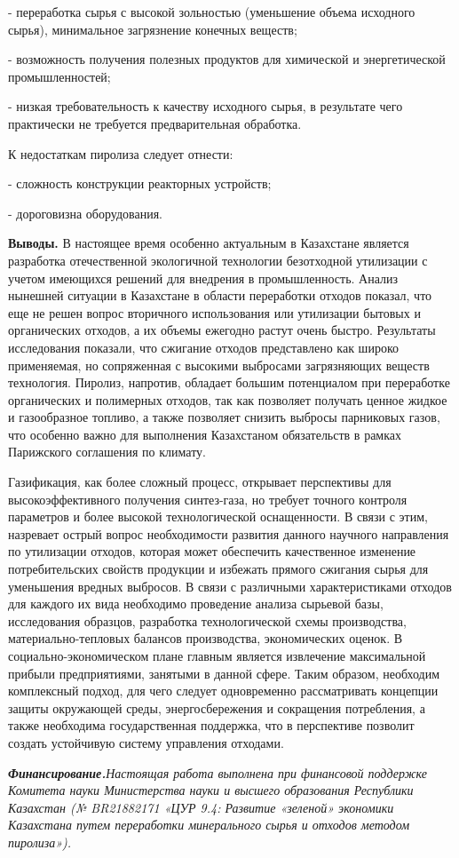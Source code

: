 \begin{multicols}{2}
- переработка сырья с высокой зольностью (уменьше­ние объема исходного
сырья), минимальное загрязнение конечных веществ;

- возможность получения полезных продуктов для химической и
энергетической промышленностей;

- низкая требовательность к качеству исходного сырья, в результате чего
практически не требуется предвари­тельная обработка.

К недостаткам пиролиза следует отнести:

- сложность конструкции реакторных устройств;

- дороговизна оборудования.

{\bfseries Выводы.} В настоящее время особенно актуальным в Казахстане
является разработка отечественной экологичной технологии безотходной
утилизации с учетом имеющихся решений для внедрения в промышленность.
Анализ нынешней ситуации в Казахстане в области переработки отходов
показал, что еще не решен вопрос вторичного использования или утилизации
бытовых и органических отходов, а их объемы ежегодно растут очень
быстро. Результаты исследования показали, что сжигание отходов
представлено как широко применяемая, но сопряженная с высокими выбросами
загрязняющих веществ технология. Пиролиз, напротив, обладает большим
потенциалом при переработке органических и полимерных отходов, так как
позволяет получать ценное жидкое и газообразное топливо, а также
позволяет снизить выбросы парниковых газов, что особенно важно для
выполнения Казахстаном обязательств в рамках Парижского соглашения по
климату.

Газификация, как более сложный процесс, открывает перспективы для
высокоэффективного получения синтез-газа, но требует точного контроля
параметров и более высокой технологической оснащенности. В связи с этим,
назревает острый вопрос необходимости развития данного научного
направления по утилизации отходов, которая может обеспечить качественное
изменение потребительских свойств продукции и избежать прямого сжигания
сырья для уменьшения вредных выбросов. В связи с различными
характеристиками отходов для каждого их вида необходимо проведение
анализа сырьевой базы, исследования образцов, разработка технологической
схемы производства, материально-тепловых балансов производства,
экономических оценок. В социально-экономическом плане главным является
извлечение максимальной прибыли предприятиями, занятыми в данной сфере.
Таким образом, необходим комплексный подход, для чего следует
одновременно рассматривать концепции защиты окружающей среды,
энергосбережения и сокращения потребления, а также необходима
государственная поддержка, что в перспективе позволит создать устойчивую
систему управления отходами.

\emph{{\bfseries Финансирование.}Настоящая работа выполнена при финансовой
поддержке Комитета науки Министерства науки и высшего образования
Республики Казахстан (№ BR21882171 «ЦУР 9.4: Развитие «зеленой»
экономики Казахстана путем переработки минерального сырья и отходов
методом пиролиза»).}
\end{multicols}

